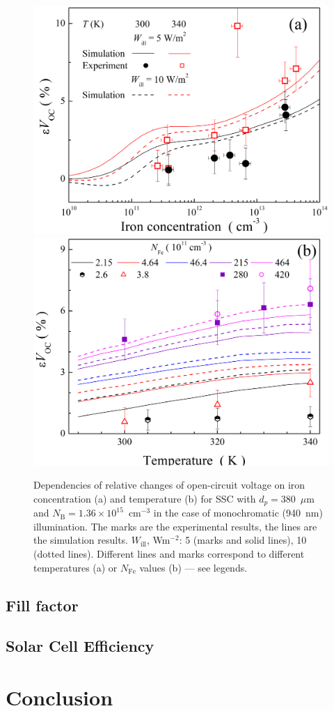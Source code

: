 \documentclass[a4paper,fleqn]{cas-sc}
\begin{document}
\begin{figure}
	\centering
     \includegraphics[width=0.4\linewidth]{Fig7a.png}
     \includegraphics[width=0.4\linewidth]{Fig7b.png}
	  \caption{Dependencies of relative changes of open-circuit voltage on iron concentration (a) and
       temperature (b) for SSC with $d_p=380$~$\mu$m and $N_\mathrm{B}=1.36\times10^{15}$~cm$^{-3}$
       in the case of monochromatic (940~nm) illumination.
       The marks are the experimental results, the lines are the simulation results.
       $W_\mathrm{ill}$, Wm$^{-2}$: 5 (marks and solid lines), 10 (dotted lines).
       Different lines and marks correspond to different temperatures (a) or $N_\mathrm{Fe}$ values (b) --- see legends.
}\label{fig7}
\end{figure}

\subsection{Fill factor}

\subsection{Solar Cell Efficiency}



\section{Conclusion}


\end{document}
